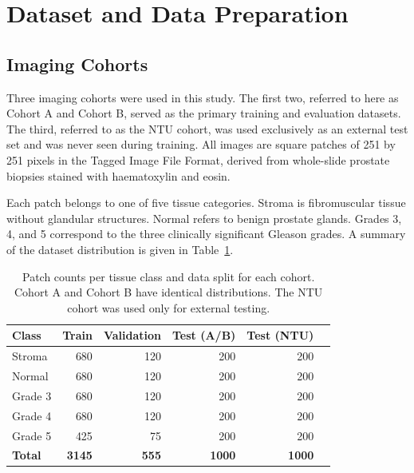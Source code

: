 \documentclass[12pt, a4paper]{article}
\begin{document}
\section{Dataset and Data Preparation}

\subsection{Imaging Cohorts}

Three imaging cohorts were used in this study. The first two, referred to here as
Cohort A and Cohort B, served as the primary training and evaluation datasets. The
third, referred to as the NTU cohort, was used exclusively as an external test set
and was never seen during training. All images are square patches of 251 by 251
pixels in the Tagged Image File Format, derived from whole-slide prostate biopsies
stained with haematoxylin and eosin.

Each patch belongs to one of five tissue categories. Stroma is fibromuscular tissue
without glandular structures. Normal refers to benign prostate glands. Grades 3,
4, and 5 correspond to the three clinically significant Gleason grades. A summary
of the dataset distribution is given in Table~\ref{tab:dataset}.

\begin{table}[H]
\centering
\caption{Patch counts per tissue class and data split for each cohort. Cohort A
and Cohort B have identical distributions. The NTU cohort was used only for
external testing.}
\label{tab:dataset}
\begin{tabular}{lrrrrr}
\toprule
\textbf{Class} & \textbf{Train} & \textbf{Validation} & \textbf{Test (A/B)} & \textbf{Test (NTU)} \\
\midrule
Stroma & 680 & 120 & 200 & 200 \\
Normal & 680 & 120 & 200 & 200 \\
Grade 3 & 680 & 120 & 200 & 200 \\
Grade 4 & 680 & 120 & 200 & 200 \\
Grade 5 & 425 &  75 & 200 & 200 \\
\midrule
\textbf{Total} & \textbf{3145} & \textbf{555} & \textbf{1000} & \textbf{1000} \\
\bottomrule
\end{tabular}
\end{table}
\end{document}
